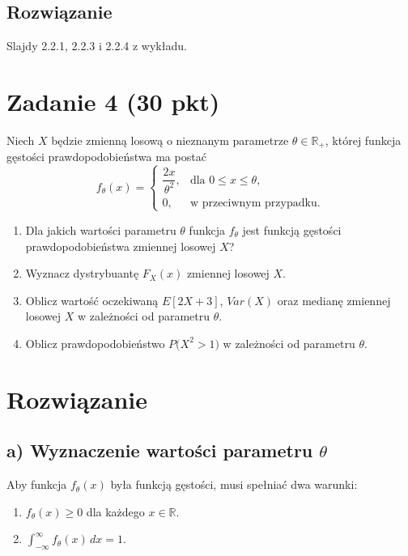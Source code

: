\documentclass[polish, 10pt]{extarticle}
\theoremstyle{definition}
\begin{document}
\subsection*{Rozwiązanie}
Slajdy 2.2.1, 2.2.3 i 2.2.4 z wykładu.

\section*{Zadanie 4 (30 pkt)}

Niech $X$ będzie zmienną losową o nieznanym parametrze $\theta \in \mathbb{R}_+$, której funkcja
gęstości prawdopodobieństwa ma postać
\[
f_\theta(x) =
\begin{cases}
\dfrac{2x}{\theta^2}, & \text{dla } 0 \leq x \leq \theta,\\[4pt]
0, & \text{w przeciwnym przypadku.}
\end{cases}
\]

\begin{enumerate}[label=\alph*)]
    \item Dla jakich wartości parametru $\theta$ funkcja $f_\theta$ jest
    funkcją gęstości prawdopodobieństwa zmiennej losowej $X$?

    \item Wyznacz dystrybuantę $F_X(x)$ zmiennej losowej $X$.

    \item Oblicz wartość oczekiwaną $E[2X+3]$, $Var(X)$ oraz medianę
    zmiennej losowej $X$ w zależności od parametru $\theta$.

    \item Oblicz prawdopodobieństwo $P\bigl(X^2 > 1\bigr)$ w zależności od parametru $\theta$.
\end{enumerate}

\section*{Rozwiązanie}

\subsection*{a) Wyznaczenie wartości parametru $\theta$}
Aby funkcja $f_\theta(x)$ była funkcją gęstości, musi spełniać dwa warunki:
\begin{enumerate}
    \item $f_\theta(x) \geq 0$ dla każdego $x \in \mathbb{R}$.
    \item $\int_{-\infty}^{\infty} f_\theta(x) \, dx = 1$.
\end{enumerate}
\end{document}

